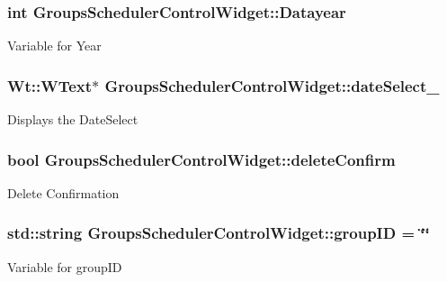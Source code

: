 \subsubsection[{\texorpdfstring{Datayear}{Datayear}}]{\setlength{\rightskip}{0pt plus 5cm}int Groups\+Scheduler\+Control\+Widget\+::\+Datayear\hspace{0.3cm}{\ttfamily [private]}}\hypertarget{classGroupsSchedulerControlWidget_a66ec7faf37c92c1f03c1bb4596cc3d35}{}\label{classGroupsSchedulerControlWidget_a66ec7faf37c92c1f03c1bb4596cc3d35}
Variable for Year 
\subsubsection[{\texorpdfstring{date\+Select\+\_\+}{dateSelect_}}]{\setlength{\rightskip}{0pt plus 5cm}Wt\+::\+W\+Text$\ast$ Groups\+Scheduler\+Control\+Widget\+::date\+Select\+\_\+\hspace{0.3cm}{\ttfamily [private]}}\hypertarget{classGroupsSchedulerControlWidget_a88b3bbe815158434533ec1dfe959b443}{}\label{classGroupsSchedulerControlWidget_a88b3bbe815158434533ec1dfe959b443}
Displays the Date\+Select 
\subsubsection[{\texorpdfstring{delete\+Confirm}{deleteConfirm}}]{\setlength{\rightskip}{0pt plus 5cm}bool Groups\+Scheduler\+Control\+Widget\+::delete\+Confirm\hspace{0.3cm}{\ttfamily [private]}}\hypertarget{classGroupsSchedulerControlWidget_a1ab13d530dbc0caf8a3e2109b92bddd8}{}\label{classGroupsSchedulerControlWidget_a1ab13d530dbc0caf8a3e2109b92bddd8}
Delete Confirmation 
\subsubsection[{\texorpdfstring{group\+ID}{groupID}}]{\setlength{\rightskip}{0pt plus 5cm}std\+::string Groups\+Scheduler\+Control\+Widget\+::group\+ID = \char`\"{}\char`\"{}\hspace{0.3cm}{\ttfamily [private]}}\hypertarget{classGroupsSchedulerControlWidget_adeedcd4b282fa78d96ca7f0943264e4f}{}\label{classGroupsSchedulerControlWidget_adeedcd4b282fa78d96ca7f0943264e4f}
Variable for group\+ID 
